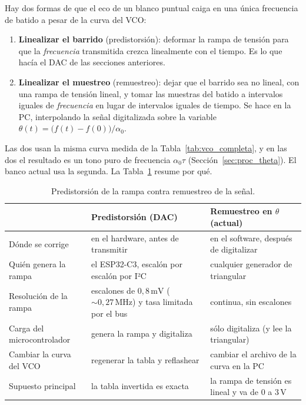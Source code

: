 \documentclass[12pt, a4paper, twoside]{report}
\begin{document}
Hay dos formas de que el eco de un blanco puntual caiga en una única
frecuencia de batido a pesar de la curva del VCO:
\begin{enumerate}
  \item \textbf{Linealizar el barrido} (predistorsión): deformar la rampa de
    tensión para que la \emph{frecuencia} transmitida crezca linealmente con
    el tiempo. Es lo que hacía el DAC de las secciones anteriores.
  \item \textbf{Linealizar el muestreo} (remuestreo): dejar que el barrido
    sea no lineal, con una rampa de tensión lineal, y tomar las muestras del
    batido a intervalos iguales de \emph{frecuencia} en lugar de intervalos
    iguales de tiempo. Se hace en la PC, interpolando la señal digitalizada
    sobre la variable $\theta(t) = \bigl(f(t) - f(0)\bigr)/\alpha_0$.
\end{enumerate}
Las dos usan la misma curva medida de la Tabla~\ref{tab:vco_completa}, y en
las dos el resultado es un tono puro de frecuencia
$\alpha_0\tau$ (Sección~\ref{sec:proc_theta}). El banco actual usa la
segunda. La Tabla~\ref{tab:vco_comparacion} resume por qué.

\begin{table}[H]
  \centering
  \caption{Predistorsión de la rampa contra remuestreo de la señal.}
  \label{tab:vco_comparacion}
  \small
  \begin{tabular}{>{\raggedright\arraybackslash}p{3.0cm}
                  >{\raggedright\arraybackslash}p{5.4cm}
                  >{\raggedright\arraybackslash}p{5.4cm}}
    \toprule
    & \textbf{Predistorsión (DAC)} & \textbf{Remuestreo en $\theta$ (actual)} \\
    \midrule
    Dónde se corrige & en el hardware, antes de transmitir
      & en el software, después de digitalizar \\
    Quién genera la rampa & el ESP32-C3, escalón por escalón por I²C
      & cualquier generador de triangular \\
    Resolución de la rampa & escalones de $0{,}8\,\text{mV}$
      ($\sim 0{,}27\,\text{MHz}$) y tasa limitada por el bus
      & continua, sin escalones \\
    Carga del microcontrolador & genera la rampa y digitaliza
      & sólo digitaliza (y lee la triangular) \\
    Cambiar la curva del VCO & regenerar la tabla y reflashear
      & cambiar el archivo de la curva en la PC \\
    Supuesto principal & la tabla invertida es exacta
      & la rampa de tensión es lineal y va de $0$ a $3\,\text{V}$ \\
    \bottomrule
  \end{tabular}
\end{table}
\end{document}
